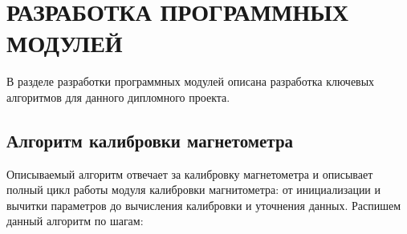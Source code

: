 \section{РАЗРАБОТКА ПРОГРАММНЫХ МОДУЛЕЙ}
\label{sec:dev}

В разделе разработки программных модулей
описана разработка ключевых алгоритмов для данного дипломного проекта.

\subsection{Алгоритм калибровки магнетометра}

Описываемый алгоритм отвечает за калибровку магнетометра и описывает полный цикл работы модуля калибровки магнитометра: от инициализации и вычитки параметров до
вычисления калибровки и уточнения данных. 
Распишем данный алгоритм по шагам:
